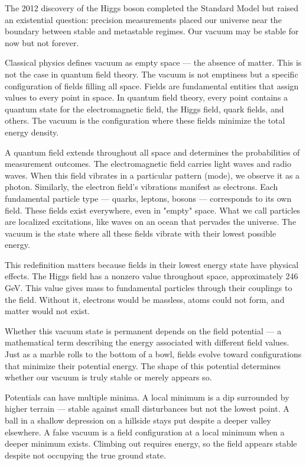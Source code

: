 
The 2012 discovery of the Higgs boson completed the Standard Model but raised an existential question: precision measurements placed our universe near the boundary between stable and metastable regimes. Our vacuum may be stable for now but not forever.

Classical physics defines vacuum as empty space — the absence of matter. This is not the case in quantum field theory. The vacuum is not emptiness but a specific configuration of fields filling all space. Fields are fundamental entities that assign values to every point in space. In quantum field theory, every point contains a quantum state for the electromagnetic field, the Higgs field, quark fields, and others. The vacuum is the configuration where these fields minimize the total energy density.

A quantum field extends throughout all space and determines the probabilities of measurement outcomes. The electromagnetic field carries light waves and radio waves. When this field vibrates in a particular pattern (mode), we observe it as a photon. Similarly, the electron field's vibrations manifest as electrons. Each fundamental particle type — quarks, leptons, bosons — corresponds to its own field. These fields exist everywhere, even in "empty" space. What we call particles are localized excitations, like waves on an ocean that pervades the universe. The vacuum is the state where all these fields vibrate with their lowest possible energy.

This redefinition matters because fields in their lowest energy state have physical effects. The Higgs field has a nonzero value throughout space, approximately 246 GeV. This value gives mass to fundamental particles through their couplings to the field. Without it, electrons would be massless, atoms could not form, and matter would not exist.

Whether this vacuum state is permanent depends on the field potential — a mathematical term describing the energy associated with different field values. Just as a marble rolls to the bottom of a bowl, fields evolve toward configurations that minimize their potential energy. The shape of this potential determines whether our vacuum is truly stable or merely appears so.

Potentials can have multiple minima. A local minimum is a dip surrounded by higher terrain — stable against small disturbances but not the lowest point. A ball in a shallow depression on a hillside stays put despite a deeper valley elsewhere. A false vacuum is a field configuration at a local minimum when a deeper minimum exists. Climbing out requires energy, so the field appears stable despite not occupying the true ground state.

